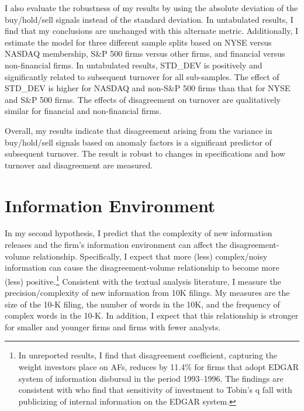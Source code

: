 \documentclass[
  12pt,
  a4paper,
  twoside,
  onecolumn]{article}
\begin{document}
I also evaluate the robustness of my results by using the absolute
deviation of the buy/hold/sell signals instead of the standard
deviation. In untabulated results, I find that my conclusions are
unchanged with this alternate metric. Additionally, I estimate the model
for three different sample splits based on NYSE versus NASDAQ
membership, S\&P 500 firms versus other firms, and financial versus
non-financial firms. In untabulated results, STD\_DEV is positively and
significantly related to subsequent turnover for all sub-samples. The
effect of STD\_DEV is higher for NASDAQ and non-S\&P 500 firms than that
for NYSE and S\&P 500 firms. The effects of disagreement on turnover are
qualitatively similar for financial and non-financial firms.

Overall, my results indicate that disagreement arising from the variance
in buy/hold/sell signals based on anomaly factors is a significant
predictor of subsequent turnover. The result is robust to changes in
specifications and how turnover and disagreement are measured.

\hypertarget{sec:info_environment}{%
\section{Information Environment}\label{sec:info_environment}}

In my second hypothesis, I predict that the complexity of new
information releases and the firm's information environment can affect
the disagreement-volume relationship. Specifically, I expect that more
(less) complex/noisy information can cause the disagreement-volume
relationship to become more (less) positive.\footnote{In unreported
  results, I find that disagreement coefficient, capturing the weight
  investors place on AFs, reduces by 11.4\% for firms that adopt EDGAR
  system of information disbursal in the period 1993--1996. The findings
  are consistent with \cite{bird_2021_publicizing} who find that
  sensitivity of investment to Tobin's q fall with publicizing of
  internal information on the EDGAR system.} Consistent with the textual
analysis literature, I measure the precision/complexity of new
information from 10K filings. My measures are the size of the 10-K
filing, the number of words in the 10K, and the frequency of complex
words in the 10-K. In addition, I expect that this relationship is
stronger for smaller and younger firms and firms with fewer analysts.
\end{document}
